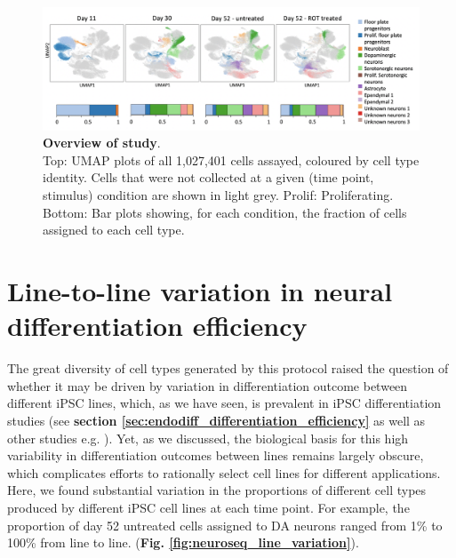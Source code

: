 \begin{figure}[h]
\centering
\includegraphics[width=17cm]{Chapter5/Fig/neuroseq_overview.png}
\caption[Overview of study]{\textbf{Overview of study}.\\
Top: UMAP plots of all 1,027,401 cells assayed, coloured by 
cell type identity. 
Cells that were not collected at a given (time point, stimulus) condition are shown in light grey. 
Prolif: Proliferating. 
Bottom: Bar plots showing, for each condition, the fraction of cells assigned to each cell type.}
\label{fig:neuroseq_overview}
\end{figure}


\newpage

\section{Line-to-line variation in neural differentiation efficiency}
\label{sec:neuroseq_diff_eff}

The great diversity of cell types generated by this protocol raised the question of whether it may be driven by variation in differentiation outcome between different iPSC lines, which, as we have seen, is prevalent in iPSC differentiation studies (see \textbf{section \ref{sec:endodiff_differentiation_efficiency}} as well as other studies e.g. \cite{d2019association, volpato2018reproducibility}). 
Yet, as we discussed, the biological basis for this high variability in differentiation outcomes between lines remains largely obscure, which complicates efforts to rationally select cell lines for different applications. 
Here, we found substantial variation in the proportions of different cell types produced by different iPSC cell lines at each time point. 
For example, the proportion of day 52 untreated cells assigned to DA neurons ranged from 1\% to 100\% from line to line.
(\textbf{Fig. \ref{fig:neuroseq_line_variation}}).


